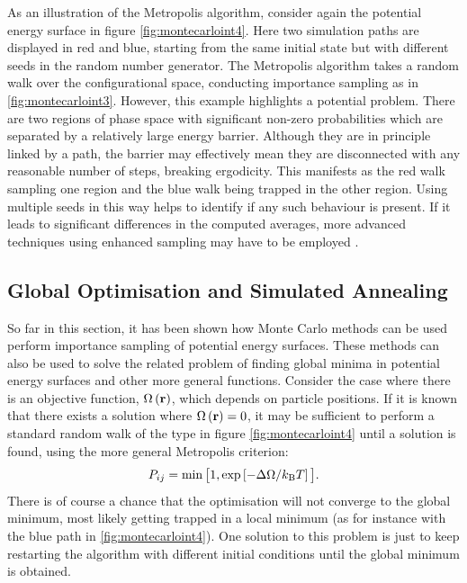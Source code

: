 As an illustration of the Metropolis algorithm, consider again the \td{} potential energy surface in figure \ref{fig:montecarloint4}.
Here two simulation paths are displayed in red and blue, starting from the same initial state but with different %
seeds in the random number generator.
The Metropolis algorithm takes a random walk over the configurational space, conducting importance sampling as in \ref{fig:montecarloint3}.
However, this example highlights a potential problem.
There are two regions of phase space with significant non\--zero probabilities which are separated by a relatively large energy barrier.
Although they are in principle linked by a path, the barrier may effectively mean they are disconnected with any reasonable number of steps, breaking ergodicity.
This manifests as the red walk sampling one region and the blue walk being trapped in the other region.
Using multiple seeds in this way helps to identify if any such behaviour is present.
If it leads to significant differences in the computed averages, more advanced techniques using enhanced sampling may have to be employed \cite{Torrie1977}.%

\subsection{Global Optimisation and Simulated Annealing}
\label{s:simulatedannealing}

So far in this section, it has been shown how Monte Carlo methods can be used perform importance sampling of potential energy surfaces.
These methods can also be used to solve the related problem of finding global minima in potential energy surfaces and other more general functions.
Consider the case where there is an objective function, $\Omega\left(\mathbf{r}\right)$, which depends on particle positions.
If it is known that there exists a solution where $\Omega\left(\mathbf{r}\right)=0$, it may be sufficient to perform a standard random walk of the type in figure \ref{fig:montecarloint4} until a solution is found, using the more general Metropolis criterion:
\begin{equation}
	\label{eq:objmetropolis}
	P_{ij} = \min\big[1,\exp\left[-\Delta\Omega/k_\text{B} T\right]\big].
\end{equation}
There is of course a chance that the optimisation will not converge to the global minimum, most likely getting trapped in a local minimum (as for instance with the blue path in \ref{fig:montecarloint4}).
One solution to this problem is just to keep restarting the algorithm with different initial conditions until the global minimum is obtained.

